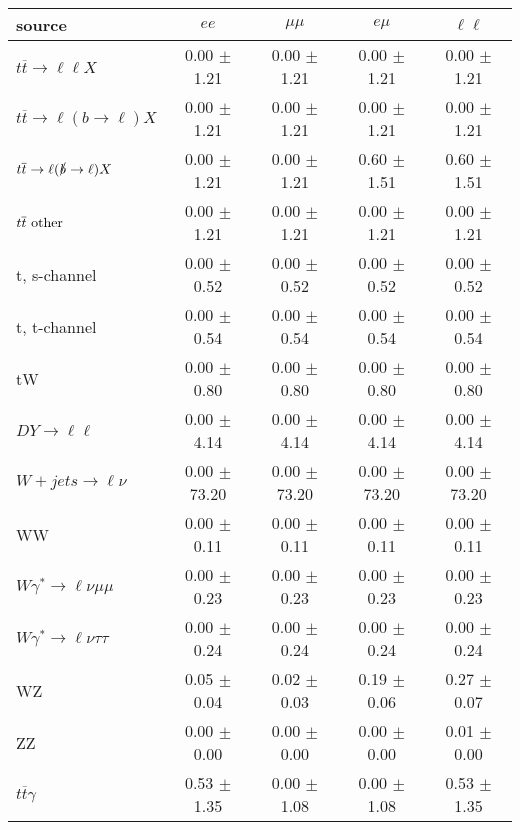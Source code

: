 \begin{tabular}{l|cccc} \hline\hline
source & $ee$ & $\mu\mu$ & $e\mu$ & $\ell\ell $ \\
\hline
$t\overline{t} \rightarrow \ell \ell X$ &  0.00 $\pm$  1.21 &  0.00 $\pm$  1.21 &  0.00 $\pm$  1.21 &  0.00 $\pm$  1.21 \\
$t\overline{t} \rightarrow \ell (b \rightarrow \ell) X$ &  0.00 $\pm$  1.21 &  0.00 $\pm$  1.21 &  0.00 $\pm$  1.21 &  0.00 $\pm$  1.21 \\
$t\overline{t} \rightarrow \ell (\slashed b \rightarrow \ell) X$ &  0.00 $\pm$  1.21 &  0.00 $\pm$  1.21 &  0.60 $\pm$  1.51 &  0.60 $\pm$  1.51 \\
        $t\overline{t}\ \rm{other}$ &  0.00 $\pm$  1.21 &  0.00 $\pm$  1.21 &  0.00 $\pm$  1.21 &  0.00 $\pm$  1.21 \\
\hline
                       t, s-channel &  0.00 $\pm$  0.52 &  0.00 $\pm$  0.52 &  0.00 $\pm$  0.52 &  0.00 $\pm$  0.52 \\
                       t, t-channel &  0.00 $\pm$  0.54 &  0.00 $\pm$  0.54 &  0.00 $\pm$  0.54 &  0.00 $\pm$  0.54 \\
                                 tW &  0.00 $\pm$  0.80 &  0.00 $\pm$  0.80 &  0.00 $\pm$  0.80 &  0.00 $\pm$  0.80 \\
\hline
         $DY \rightarrow \ell \ell$ &  0.00 $\pm$  4.14 &  0.00 $\pm$  4.14 &  0.00 $\pm$  4.14 &  0.00 $\pm$  4.14 \\
      $W+jets \rightarrow \ell \nu$ &  0.00 $\pm$ 73.20 &  0.00 $\pm$ 73.20 &  0.00 $\pm$ 73.20 &  0.00 $\pm$ 73.20 \\
                                 WW &  0.00 $\pm$  0.11 &  0.00 $\pm$  0.11 &  0.00 $\pm$  0.11 &  0.00 $\pm$  0.11 \\
\hline
$W\gamma^{*} \rightarrow \ell \nu \mu\mu$ &  0.00 $\pm$  0.23 &  0.00 $\pm$  0.23 &  0.00 $\pm$  0.23 &  0.00 $\pm$  0.23 \\
$W\gamma^{*} \rightarrow \ell \nu \tau\tau$ &  0.00 $\pm$  0.24 &  0.00 $\pm$  0.24 &  0.00 $\pm$  0.24 &  0.00 $\pm$  0.24 \\
                                 WZ &  0.05 $\pm$  0.04 &  0.02 $\pm$  0.03 &  0.19 $\pm$  0.06 &  0.27 $\pm$  0.07 \\
                                 ZZ &  0.00 $\pm$  0.00 &  0.00 $\pm$  0.00 &  0.00 $\pm$  0.00 &  0.01 $\pm$  0.00 \\
\hline
              $t\overline{t}\gamma$ &  0.53 $\pm$  1.35 &  0.00 $\pm$  1.08 &  0.00 $\pm$  1.08 &  0.53 $\pm$  1.35 \\

\end{tabular}
